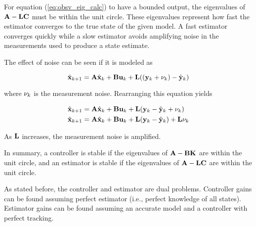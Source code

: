 For equation (\ref{eq:obsv_eig_calc}) to have a bounded output, the eigenvalues
of $\mathbf{A} - \mathbf{L}\mathbf{C}$ must be within the unit circle. These eigenvalues
represent how fast the estimator converges to the true state of the given
\gls{model}. A fast estimator converges quickly while a slow estimator avoids
amplifying noise in the measurements used to produce a state estimate.

The effect of noise can be seen if it is modeled
 as

\begin{equation*}
  \hat{\mathbf{x}}_{k+1} = \mathbf{A}\hat{\mathbf{x}}_k + \mathbf{B}\mathbf{u}_k +
    \mathbf{L} ((\mathbf{y}_k + \mathbf{\nu}_k) - \hat{\mathbf{y}}_k) \\
\end{equation*}

where $\mathbf{\nu}_k$ is the measurement noise. Rearranging this equation yields

\begin{align*}
  \hat{\mathbf{x}}_{k+1} &= \mathbf{A}\hat{\mathbf{x}}_k + \mathbf{B}\mathbf{u}_k +
    \mathbf{L} (\mathbf{y}_k - \hat{\mathbf{y}}_k + \mathbf{\nu}_k) \\
  \hat{\mathbf{x}}_{k+1} &= \mathbf{A}\hat{\mathbf{x}}_k + \mathbf{B}\mathbf{u}_k +
    \mathbf{L} (\mathbf{y}_k - \hat{\mathbf{y}}_k) + \mathbf{L}\mathbf{\nu}_k
\end{align*}

As $\mathbf{L}$ increases, the measurement noise is amplified.

In summary, a controller is stable if the eigenvalues of
$\mathbf{A} - \mathbf{B}\mathbf{K}$ are within the unit circle, and an estimator is
stable if the eigenvalues of $\mathbf{A} - \mathbf{L}\mathbf{C}$ are within the unit
circle.

As stated before, the controller and estimator are dual problems. Controller
gains can be found assuming perfect estimator (i.e., perfect knowledge of all
\glspl{state}). Estimator gains can be found assuming an accurate \gls{model}
and a controller with perfect \gls{tracking}.
